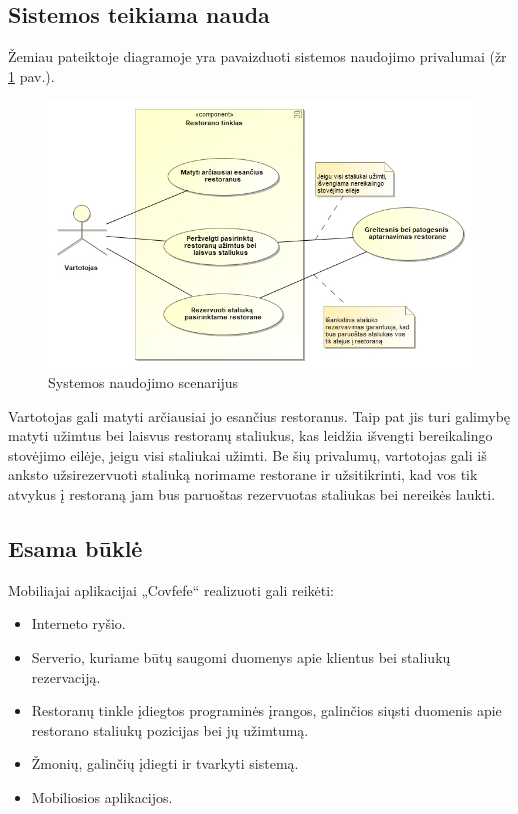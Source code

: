 \documentclass{VUMIFPSkursinis}
\begin{document}
\subsection{Sistemos teikiama nauda}

Žemiau pateiktoje diagramoje yra pavaizduoti sistemos naudojimo privalumai (žr \ref{fig:systemusingbenefits} pav.).

	\begin {figure}[H]
	\centering	
		
		\includegraphics[scale=0.7]{img/3lab/SystemUsingBenefits.jpg}
		\caption{Systemos naudojimo scenarijus}
		\label{fig:systemusingbenefits}
	\end{figure}

Vartotojas gali matyti arčiausiai jo esančius restoranus. Taip pat jis turi galimybę matyti užimtus bei laisvus restoranų staliukus, kas leidžia išvengti bereikalingo stovėjimo eilėje, jeigu visi staliukai užimti. Be šių privalumų, vartotojas gali iš anksto užsirezervuoti staliuką norimame restorane ir užsitikrinti, kad vos tik atvykus į restoraną jam bus paruoštas rezervuotas staliukas bei nereikės laukti.

\subsection{Esama būklė}

Mobiliajai aplikacijai „Covfefe“ realizuoti gali reikėti:
\begin{itemize}
\item Interneto ryšio.
\item Serverio, kuriame būtų saugomi duomenys apie klientus bei staliukų rezervaciją.
\item Restoranų tinkle įdiegtos programinės įrangos, galinčios siųsti duomenis apie restorano staliukų pozicijas bei jų užimtumą.
\item Žmonių, galinčių įdiegti ir tvarkyti sistemą.
\item Mobiliosios aplikacijos.
\end{itemize}
\end{document}
